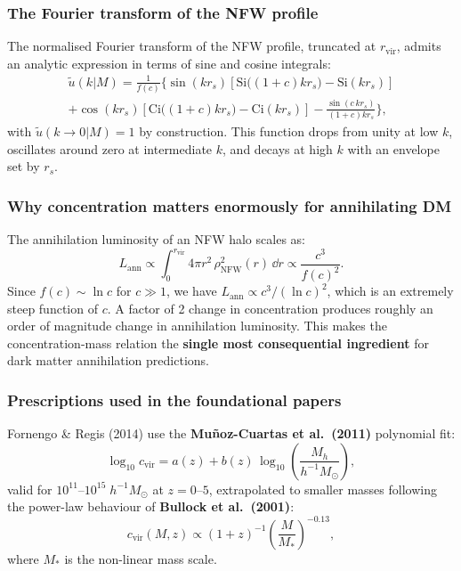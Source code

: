 \documentclass[10pt,a4paper]{article}
\newcommand{\utilde}{\tilde{u}}
\newcommand{\Msun}{M_\odot}
\begin{document}
\subsubsection{The Fourier transform of the NFW profile}

The normalised Fourier transform of the NFW profile, truncated at $r_{\mathrm{vir}}$, admits an analytic expression in terms of sine and cosine integrals:
\begin{multline}
\label{eq:NFW_FT}
\utilde(k | M) = \frac{1}{f(c)} \bigg\{ \sin(kr_s) \left[\mathrm{Si}\big((1{+}c) kr_s\big) - \mathrm{Si}(kr_s)\right] \\
+ \cos(kr_s) \left[\mathrm{Ci}\big((1{+}c) kr_s\big) - \mathrm{Ci}(kr_s)\right] - \frac{\sin(c \, kr_s)}{(1{+}c) kr_s} \bigg\},
\end{multline}
with $\utilde(k \to 0 | M) = 1$ by construction. This function drops from unity at low $k$, oscillates around zero at intermediate $k$, and decays at high $k$ with an envelope set by $r_s$.

\subsubsection{Why concentration matters enormously for annihilating DM}

The annihilation luminosity of an NFW halo scales as:
\begin{equation}
L_{\mathrm{ann}} \propto \int_0^{r_{\mathrm{vir}}} 4\pi r^2 \, \rho_{\mathrm{NFW}}^2(r) \, \dd r \propto \frac{c^3}{f(c)^2}.
\end{equation}
Since $f(c) \sim \ln c$ for $c \gg 1$, we have $L_{\mathrm{ann}} \propto c^3/(\ln c)^2$, which is an extremely steep function of $c$. A factor of 2 change in concentration produces roughly an order of magnitude change in annihilation luminosity. This makes the concentration-mass relation the \textbf{single most consequential ingredient} for dark matter annihilation predictions.

\subsubsection{Prescriptions used in the foundational papers}

Fornengo \& Regis (2014) use the \textbf{Mu\~{n}oz-Cuartas et al.\ (2011)} polynomial fit:
\begin{equation}
\log_{10} c_{\mathrm{vir}} = a(z) + b(z) \, \log_{10}\!\left(\frac{M_h}{h^{-1}\Msun}\right),
\end{equation}
valid for $10^{11}$--$10^{15} \; h^{-1} \Msun$ at $z = 0$--$5$, extrapolated to smaller masses following the power-law behaviour of \textbf{Bullock et al.\ (2001)}:
\begin{equation}
c_{\mathrm{vir}}(M, z) \propto (1 + z)^{-1} \left(\frac{M}{M_*}\right)^{-0.13},
\end{equation}
where $M_*$ is the non-linear mass scale.
\end{document}
